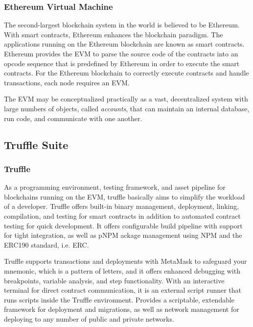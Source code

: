 \subsubsection{Ethereum Virtual Machine}

The second-largest blockchain system in the world is believed to be Ethereum. With smart contracts, Ethereum enhances the blockchain paradigm. The applications running on the Ethereum blockchain are known as smart contracts. Ethereum provides the \ac{EVM} to parse the source code of the contracts into an opcode sequence that is predefined by Ethereum in order to execute the smart contracts. For the Ethereum blockchain to correctly execute contracts and handle transactions, each node requires an \ac{EVM}.

\vspace{.5cm}

The \ac{EVM} may be conceptualized practically as a vast, decentralized system with large numbers of objects, called \textit{accounts}, that can maintain an internal database, run code, and communicate with one another.

\subsection{Truffle Suite}
\subsubsection{Truffle}

As a programming environment, testing framework, and asset pipeline for blockchains running on the \ac{EVM}, truffle basically aims to simplify the workload of a developer. Truffle offers built-in binary management, deployment, linking, compilation, and testing for smart contracts in addition to automated contract testing for quick development. It offers configurable build pipeline with support for tight integration, as well as pNPM ackage management using \ac{NPM} and the ERC190 standard, i.e. \ac{ERC}.

\vspace{.5cm}

Truffle supports transactions and deployments with MetaMask to safeguard your mnemonic, which is a pattern of letters, and it offers enhanced debugging with breakpoints, variable analysis, and step functionality.
With an interactive terminal for direct contract communication, it is an external script runner that runs scripts inside the Truffle environment.
Provides a scriptable, extendable framework for deployment and migrations, as well as network management for deploying to any number of public and private networks.

